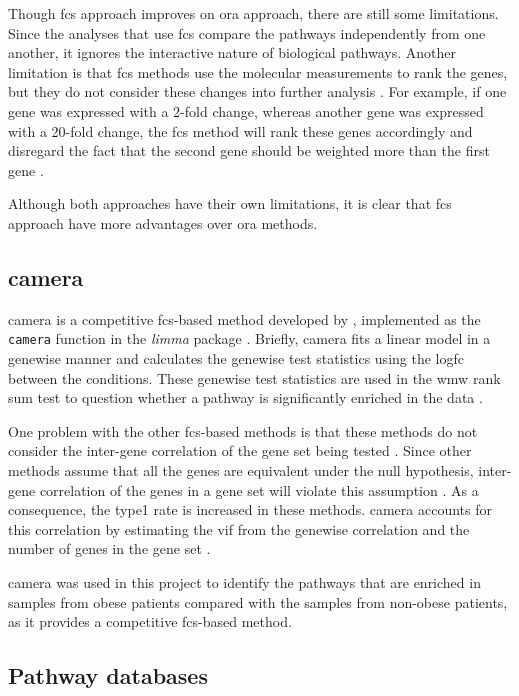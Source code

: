 Though \gls{fcs} approach improves on \gls{ora} approach, there are still some limitations.
Since the analyses that use \gls{fcs} compare the pathways independently from one another, it ignores the interactive nature of biological pathways.
Another limitation is that \gls{fcs} methods use the molecular measurements to rank the genes, but they do not consider these changes into further analysis \citep{Khatri2012}.
For example, if one gene was expressed with a 2-fold change, whereas another gene was expressed with a 20-fold change, the \gls{fcs} method will rank these genes accordingly and disregard the fact that the second gene should be weighted more than the first gene \citep{Khatri2012}.

Although both approaches have their own limitations, it is clear that \gls{fcs} approach have more advantages over \gls{ora} methods.

\subsection{\Gls{camera}}
\label{sub:camera}

\Acrfull{camera} is a competitive \gls{fcs}-based method developed by \citet{Wu2012}, implemented as the \texttt{camera} function in the \textit{limma} package \citep{Ritchie2015}.
Briefly, \gls{camera} fits a linear model in a genewise manner and calculates the genewise test statistics using the log\gls{fc} between the conditions.
These genewise test statistics are used in the \gls{wmw} rank sum test to question whether a pathway is significantly enriched in the data \citep{Wu2012}.

One problem with the other \gls{fcs}-based methods is that these methods do not consider the inter-gene correlation of the gene set being tested \citep{Wu2012}.
Since other methods assume that all the genes are equivalent under the null hypothesis, inter-gene correlation of the genes in a gene set will violate this assumption \citep{Wu2012}.
As a consequence, the \gls{type1} rate is increased in these methods.
\Gls{camera} accounts for this correlation by estimating the \gls{vif} from the genewise correlation and the number of genes in the gene set \citep{Wu2012}.

\gls{camera} was used in this project to identify the pathways that are enriched in samples from obese patients compared with the samples from non-obese patients, as it provides a competitive \gls{fcs}-based method.

\subsection{Pathway databases}
\label{sub:pathway_databases}

